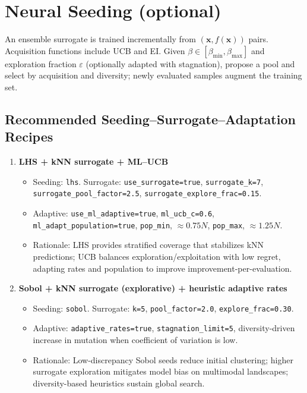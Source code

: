 \documentclass[12pt,a4paper]{article}
\begin{document}
\section{Neural Seeding (optional)}\label{sec:neural}
An ensemble surrogate is trained incrementally from $(\bm{x},f(\bm{x}))$ pairs. Acquisition functions include UCB and EI. Given $\beta\in[\beta_{\min},\beta_{\max}]$ and exploration fraction $\varepsilon$ (optionally adapted with stagnation), propose a pool and select by acquisition and diversity; newly evaluated samples augment the training set.

\subsection{Recommended Seeding–Surrogate–Adaptation Recipes}
\label{sec}
\begin{enumerate}

\item \textbf{LHS + kNN surrogate + ML–UCB}
\begin{itemize}
\item Seeding: \texttt{lhs}. Surrogate: \texttt{use\_surrogate=true}, \texttt{surrogate\_k=7}, \texttt{surrogate\_pool\_factor=2.5}, \texttt{surrogate\_explore\_frac=0.15}.
\item Adaptive: \texttt{use\_ml\_adaptive=true}, \texttt{ml\_ucb\_c=0.6}, \texttt{ml\_adapt\_population=true}, \texttt{pop\_min}, $\approx 0.75N$, \texttt{pop\_max}, $\approx 1.25N$.
\item Rationale: LHS provides stratified coverage that stabilizes kNN predictions; UCB balances exploration/exploitation with low regret, adapting rates and population to improve improvement-per-evaluation.
\end{itemize}

\item \textbf{Sobol + kNN surrogate (explorative) + heuristic adaptive rates}
\begin{itemize}
\item Seeding: \texttt{sobol}. Surrogate: \texttt{k=5}, \texttt{pool\_factor=2.0}, \texttt{explore\_frac=0.30}.
\item Adaptive: \texttt{adaptive\_rates=true}, \texttt{stagnation\_limit=5}, diversity-driven increase in mutation when coefficient of variation is low.
\item Rationale: Low-discrepancy Sobol seeds reduce initial clustering; higher surrogate exploration mitigates model bias on multimodal landscapes; diversity-based heuristics sustain global search.
\end{itemize}


\end{enumerate}
\end{document}
